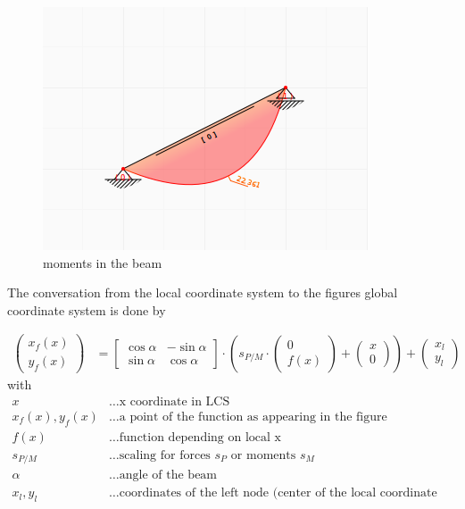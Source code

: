 \documentclass[a4paper,11pt]{report}
\begin{document}
\hfill
\begin{minipage}[h]{0.3\textwidth}
\begin{figure}[H]
\begin{center}
\includegraphics[width=\textwidth]{../pictures/momentsresults.png}
\caption{moments in the beam}
\label{pic:momentbeamforce}
\end{center}
\end{figure}
\end{minipage}

The conversation from the local coordinate system to the figures global coordinate system is done by

\begin{align}
\left(\begin{array}{r} x_f(x)\\ y_f(x) \end{array} \right) &= \left[\begin{array}{rr} \cos\alpha & -\sin\alpha \\ \sin\alpha & \cos\alpha\end{array}\right] \cdot \left( s_{P/M} \cdot  \left(\begin{array}{r} 0 \\ f(x) \end{array}\right) + \left(\begin{array}{r} x \\ 0 \end{array}\right) \right) + \left(\begin{array}{r} x_l \\ y_l \end{array}\right)
\end{align}
with
\begin{align*}
x &\dots \text{x coordinate in LCS}\\
x_f(x), y_f(x) &\dots \text{a point of the function as appearing in the figure}\\
f(x) &\dots \text{function depending on local x}\\
s_{P/M} &\dots \text{scaling for forces $s_P$ or moments $s_M$}\\
\alpha &\dots \text{angle of the beam}\\
x_l, y_l &\dots \text{coordinates of the left node (center of the local coordinate system)}
\end{align*}
\end{document}
